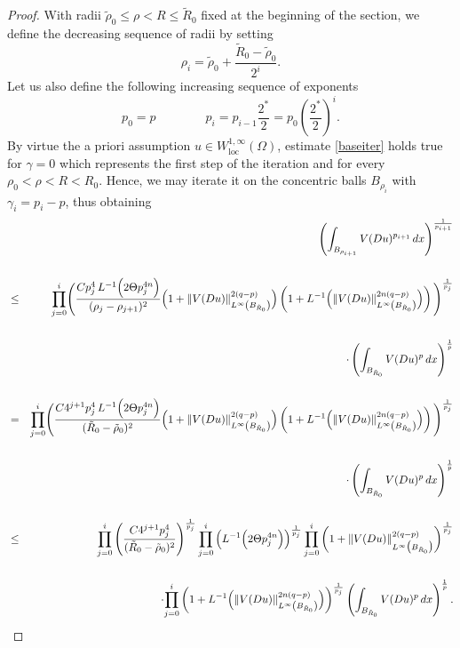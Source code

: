 \documentclass[12pt]{amsart}
\theoremstyle{definition}
\numberwithin{equation}{section}
\numberwithin{equation}{section}
\begin{document}
{\begin{proof}
With radii $\tilde \rho_0\le  \rho< R\le \tilde R_0$ fixed at the beginning of the section, we define the decreasing sequence of radii by setting
$$\rho_i= \tilde\rho_0+\frac{ \tilde R_0- \tilde\rho_0}{2^i}.$$
Let us also define the following increasing sequence of exponents
$$p_0=p \qquad\qquad {p_{i}}={p_{i-1}}\frac{2^*}{2}=p_0\left(\frac{2^*}{2}\right)^{i}.$$
By virtue the a priori assumption $u\in W^{1,\infty}_{\mathrm{loc}}(\Omega)$, estimate \eqref{baseiter} holds true for $\gamma=0$ {which represents the first step of the iteration} and for every $ \rho_0<\rho<R< R_0$. Hence, we may iterate it  on the concentric balls $B_{\rho_i}$  {with $\gamma_i = p_i - p$}, thus obtaining
\begin{eqnarray}\label{stimapreitepassoi}
&&\left ( \int_{B_{\rho_{i+1}}}  V(Du)^{p_{i+1}}\, dx\right )^{\frac{1}{p_{i+1}}} 	\cr\cr
&\le& \displaystyle{\prod_{j=0}^{i}}\Bigg( \frac{Cp_j^{4}\,{L}^{-1} \Big({2} \Theta p_j^{4n}\Big)}{(\rho_j - \rho_{j+1})^{2}} {\Big(1+\|V(Du)\|^{2(q-p)}_{L^\infty\left(B_{ \tilde R_0}\right)}\Big)}\left(1+{{L}^{-1} \Big(\|V(Du)\|^{2n(q-p)}_{L^\infty\left(B_{ \tilde R_0}\right)}\Big)}\right)\Bigg)^{\frac{1}{p_j}}\cr\cr 
&&\qquad\qquad\cdot\left(\int_{B_{\tilde R_0}}V(Du)^{p}  \,
dx\right)^{\frac{1}{p}}\cr\cr
&=& \displaystyle{\prod_{j=0}^{i}}\Bigg({\frac{C4^{j+1} p_j^{4}\,{{L}^{-1} \Big({2} \Theta p_j^{4n}\Big)}}{( \tilde R_0- \tilde \rho_0 )^{2}}} {\Big(1+\|V(Du)\|^{2(q-p)}_{L^\infty\left(B_{ \tilde R_0}\right)}\Big)}\left(1+{{L}^{-1} \Big(\|V(Du)\|^{2n(q-p)}_{L^\infty\left(B_{ \tilde R_0}\right)}\Big)}\right)\Bigg)^{\frac{1}{p_j}} \cr\cr 
&&\qquad\qquad\cdot\left(\int_{B_{\tilde R_0}}V(Du)^{p}  \,
dx\right)^{\frac{1}{p}}\cr\cr
&\le& \displaystyle{\prod_{j=0}^{i}}\left({\frac{C4^{j+1} p_j^{4}}{( \tilde R_0- \tilde \rho_0 )^{2}}} \right)^{\frac{1}{p_j}}\displaystyle{\prod_{j=0}^{i}}\left({{L}^{-1} \Big({2} \Theta p_j^{4n}\Big)} \right)^{\frac{1}{p_j}} \displaystyle{\prod_{j=0}^{i}}\left(1+\|V(Du)\|^{2(q-p)}_{L^\infty\big(B_{ \tilde R_0}\big)}\right)^{\frac{1}{p_j}}\cr\cr
&&\qquad\qquad\cdot\displaystyle{\prod_{j=0}^{i}}\left(1+{{L}^{-1} \Big(\|V(Du)\|^{2n(q-p)}_{L^\infty\left(B_{ \tilde R_0}\right)}\Big)}\right)^{\frac{1}{p_j}}\left(\int_{B_{\tilde R_0}}V(Du)^{p}  \, dx\right)^{\frac{1}{p}}.
\end{eqnarray}

\end{proof}}
\end{document}
